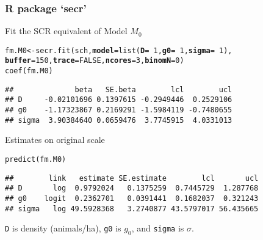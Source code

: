 \documentclass[color=usenames,dvipsnames]{beamer}\usepackage[]{graphicx}\usepackage[]{color}
\makeatletter
\newcommand{\hlnum}[1]{\textcolor[rgb]{0.69,0.494,0}{#1}}%
\newcommand{\hlopt}[1]{\textcolor[rgb]{0,0,0}{#1}}%
\newcommand{\hlstd}[1]{\textcolor[rgb]{0,0,0}{#1}}%
\newcommand{\hlkwb}[1]{\textcolor[rgb]{0,0.341,0.682}{#1}}%
\newcommand{\hlkwc}[1]{\textcolor[rgb]{0,0,0}{\textbf{#1}}}%
\newcommand{\hlkwd}[1]{\textcolor[rgb]{0.004,0.004,0.506}{#1}}%
\newenvironment{kframe}{%
 \def\at@end@of@kframe{}%
 \ifinner\ifhmode%
  \def\at@end@of@kframe{\end{minipage}}%
  \begin{minipage}{\columnwidth}%
 \fi\fi%
 \def\FrameCommand##1{\hskip\@totalleftmargin \hskip-\fboxsep
 \colorbox{shadecolor}{##1}\hskip-\fboxsep
     \hskip-\linewidth \hskip-\@totalleftmargin \hskip\columnwidth}%
 \MakeFramed {\advance\hsize-\width
   \@totalleftmargin\z@ \linewidth\hsize
   \@setminipage}}%
 {\par\unskip\endMakeFramed%
 \at@end@of@kframe}
\newenvironment{knitrout}{}{} %
\newcommand{\inr}[1]{\colorbox{inlinecolor}{\texttt{#1}}}
\makeatother
\begin{document}
\begin{frame}[fragile]
  \frametitle{R package `secr'}
  Fit the SCR equivalent of Model $M_0$
\begin{knitrout}\scriptsize
{}\color{fgcolor}\begin{kframe}
\begin{alltt}
\hlstd{fm.M0} \hlkwb{<-} \hlkwd{secr.fit}\hlstd{(sch,} \hlkwc{model}\hlstd{=}\hlkwd{list}\hlstd{(}\hlkwc{D}\hlstd{=}\hlopt{~}\hlnum{1}\hlstd{,} \hlkwc{g0}\hlstd{=}\hlopt{~}\hlnum{1}\hlstd{,} \hlkwc{sigma}\hlstd{=}\hlopt{~}\hlnum{1}\hlstd{),}
                  \hlkwc{buffer}\hlstd{=}\hlnum{150}\hlstd{,} \hlkwc{trace}\hlstd{=}\hlnum{FALSE}\hlstd{,} \hlkwc{ncores}\hlstd{=}\hlnum{3}\hlstd{,} \hlkwc{binomN}\hlstd{=}\hlnum{0}\hlstd{)}
\hlkwd{coef}\hlstd{(fm.M0)}
\end{alltt}
\begin{verbatim}
##              beta   SE.beta        lcl        ucl
## D     -0.02101696 0.1397615 -0.2949446  0.2529106
## g0    -1.17323867 0.2169291 -1.5984119 -0.7480655
## sigma  3.90384640 0.0659476  3.7745915  4.0331013
\end{verbatim}
\end{kframe}
\end{knitrout}
\pause
\vfill
Estimates on original scale
\begin{knitrout}\scriptsize
{}\color{fgcolor}\begin{kframe}
\begin{alltt}
\hlkwd{predict}\hlstd{(fm.M0)}
\end{alltt}
\begin{verbatim}
##        link   estimate SE.estimate        lcl       ucl
## D       log  0.9792024   0.1375259  0.7445729  1.287768
## g0    logit  0.2362701   0.0391441  0.1682037  0.321243
## sigma   log 49.5928368   3.2740877 43.5797017 56.435665
\end{verbatim}
\end{kframe}
\end{knitrout}
\inr{D} is density (animals/ha), \inr{g0} is $g_0$, and \inr{sigma} is 
$\sigma$.   
\end{frame}
\end{document}
